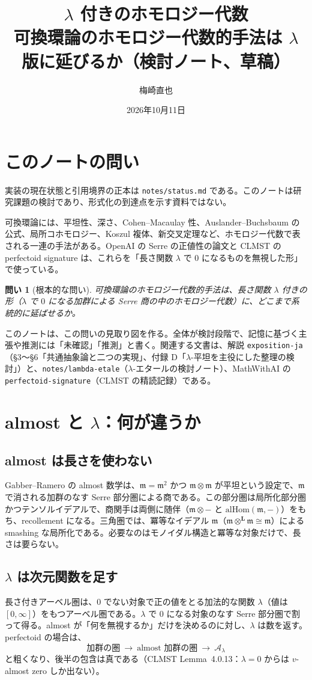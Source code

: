 \documentclass[11pt,a4paper]{ltjsarticle}
\title{$\lambda$ 付きのホモロジー代数\\[2pt]\large 可換環論のホモロジー代数的手法は $\lambda$ 版に延びるか（検討ノート、草稿）}
\author{梅崎直也}
\date{2026年10月11日}
\theoremstyle{plain}
\newtheorem{question}{問い}
\theoremstyle{definition}
\theoremstyle{remark}
\theoremstyle{plain}
\newcommand{\m}{\mathfrak{m}}
\begin{document}
\maketitle

\section*{このノートの問い}

実装の現在状態と引用境界の正本は \texttt{notes/status.md} である。このノートは研究課題の検討であり、形式化の到達点を示す資料ではない。

可換環論には、平坦性、深さ、Cohen--Macaulay 性、Auslander--Buchsbaum の公式、局所コホモロジー、Koszul 複体、新交叉定理など、ホモロジー代数で表される一連の手法がある。OpenAI の Serre の正値性の論文と CLMST の perfectoid signature は、これらを「長さ関数 $\lambda$ で $0$ になるものを無視した形」で使っている。
\begin{question}[根本的な問い]
可換環論のホモロジー代数的手法は、長さ関数 $\lambda$ 付きの形（$\lambda$ で $0$ になる加群による Serre 商の中のホモロジー代数）に、どこまで系統的に延ばせるか。
\end{question}
このノートは、この問いの見取り図を作る。全体が検討段階で、記憶に基づく主張や推測には「未確認」「推測」と書く。関連する文書は、解説 \texttt{exposition-ja}（§3〜§6「共通抽象論と二つの実現」、付録 D「$\lambda$-平坦を主役にした整理の検討」）と、\texttt{notes/lambda-etale}（$\lambda$-エタールの検討ノート）、MathWithAI の \texttt{perfectoid-signature}（CLMST の精読記録）である。

\section{almost と $\lambda$：何が違うか}

\subsection{almost は長さを使わない}
Gabber--Ramero の almost 数学は、$\m = \m^2$ かつ $\m\otimes\m$ が平坦という設定で、$\m$ で消される加群のなす Serre 部分圏による商である。この部分圏は局所化部分圏かつテンソルイデアルで、商関手は両側に随伴（$\m\otimes-$ と $\mathrm{alHom}(\m,-)$）をもち、recollement になる。三角圏では、冪等なイデアル $\m$（$\m\otimes^{\mathbf{L}}\m\cong\m$）による smashing な局所化である。必要なのはモノイダル構造と冪等な対象だけで、長さは要らない。

\subsection{$\lambda$ は次元関数を足す}
長さ付きアーベル圏は、$0$ でない対象で正の値をとる加法的な関数 $\lambda$（値は $[0,\infty]$）をもつアーベル圏である。$\lambda$ で $0$ になる対象のなす Serre 部分圏で割って得る。almost が「何を無視するか」だけを決めるのに対し、$\lambda$ は数を返す。perfectoid の場合は、
\[
  \text{加群の圏}\ \to\ \text{almost 加群の圏}\ \to\ \mathscr{A}_\lambda
\]
と粗くなり、後半の包含は真である（CLMST Lemma~4.0.13：$\lambda = 0$ からは $v$-almost zero しか出ない）。
\end{document}
